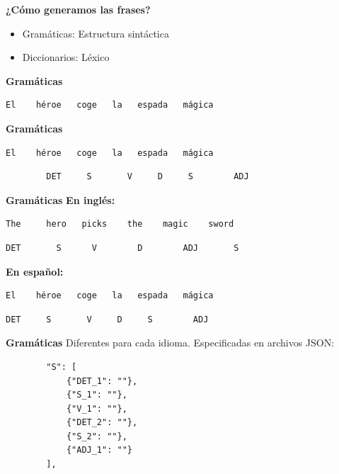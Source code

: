 \begin{tframe}{\textbf{¿Cómo generamos las frases?}}
	\begin{itemize}
		\item<+-| alert@+> Gramáticas: Estructura sintáctica
		\item Diccionarios: Léxico
	\end{itemize}
\end{tframe}

\begin{frame}[t, fragile]{\textbf{Gramáticas}}
	\vspace*{\fill}
	\begin{Verbatim}
El    héroe   coge   la   espada   mágica
	\end{Verbatim}
	\vspace*{\fill}
\end{frame}

\begin{frame}[t, fragile]{\textbf{Gramáticas}}
	\vspace*{\fill}
	\begin{Verbatim}
El    héroe   coge   la   espada   mágica
	\end{Verbatim}
	\begin{verbatim}
		DET     S       V     D     S        ADJ
	\end{verbatim}
	\vspace*{\fill}
\end{frame}

\begin{frame}[t, fragile]{\textbf{Gramáticas}}
\textbf{En inglés:}

	\begin{Verbatim}
The     hero   picks    the    magic    sword
	\end{Verbatim}
	\begin{Verbatim}
DET       S      V        D        ADJ       S
	\end{Verbatim}
\vspace*{12px}
\textbf{En español:}
	\begin{Verbatim}
El    héroe   coge   la   espada   mágica
	\end{Verbatim}
	\begin{Verbatim}
DET     S       V     D     S        ADJ
	\end{Verbatim}
\end{frame}

\begin{frame}[t, fragile]{\textbf{Gramáticas}}
Diferentes para cada idioma. Especificadas en archivos JSON:
	\begin{verbatim}
		"S": [
	    	{"DET_1": ""},
	    	{"S_1": ""},
	    	{"V_1": ""},
	    	{"DET_2": ""},
	    	{"S_2": ""},
	    	{"ADJ_1": ""}
		],
	\end{verbatim}
\end{frame}

